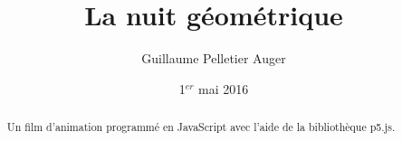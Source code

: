 \documentclass[10pt]{article}
\author{Guillaume Pelletier Auger}
\title{La nuit géométrique}
\date{1$^{er}$ mai 2016}
\begin{document}
\maketitle
\begin{abstract}
    Un film d'animation programmé en JavaScript avec l'aide de la bibliothèque p5.js.
\end{abstract}


% 
% 
\end{document}
